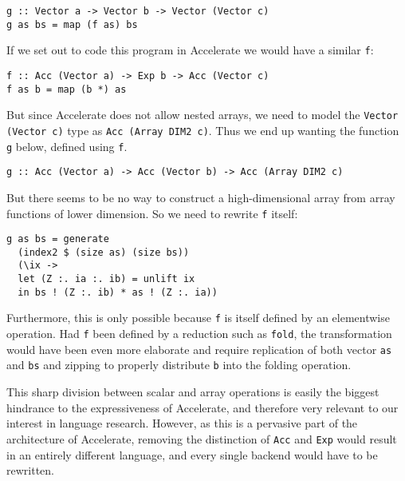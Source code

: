 \begin{verbatim}
g :: Vector a -> Vector b -> Vector (Vector c)
g as bs = map (f as) bs
\end{verbatim}

If we set out to code this program in Accelerate we would have a similar
\texttt{f}:

\begin{verbatim}
f :: Acc (Vector a) -> Exp b -> Acc (Vector c)
f as b = map (b *) as
\end{verbatim}

But since Accelerate does not allow nested arrays, we need to model the
\texttt{Vector (Vector c)} type  as \texttt{Acc (Array DIM2 c)}. Thus we end up
wanting the function \texttt{g} below, defined using \texttt{f}.

\begin{verbatim}
g :: Acc (Vector a) -> Acc (Vector b) -> Acc (Array DIM2 c)
\end{verbatim}

But there seems to be no way to construct a high-dimensional array from array
functions of lower dimension. So we need to rewrite \texttt{f} itself:

\begin{verbatim}
g as bs = generate
  (index2 $ (size as) (size bs))
  (\ix ->
  let (Z :. ia :. ib) = unlift ix
  in bs ! (Z :. ib) * as ! (Z :. ia))
\end{verbatim}

Furthermore, this is only possible because \texttt{f} is itself defined by an
elementwise operation. Had \texttt{f} been defined by a reduction such as
\texttt{fold}, the transformation would have been even more elaborate and
require replication of both vector \texttt{as} and \texttt{bs} and zipping to
properly distribute \texttt{b} into the folding operation.


This sharp division between scalar and array operations is easily the biggest
hindrance to the expressiveness of Accelerate, and therefore very relevant to
our interest in language research. However, as this is a pervasive part of the
architecture of Accelerate, removing the distinction of \texttt{Acc} and
\texttt{Exp} would result in an entirely different language, and every single
backend would have to be rewritten.

